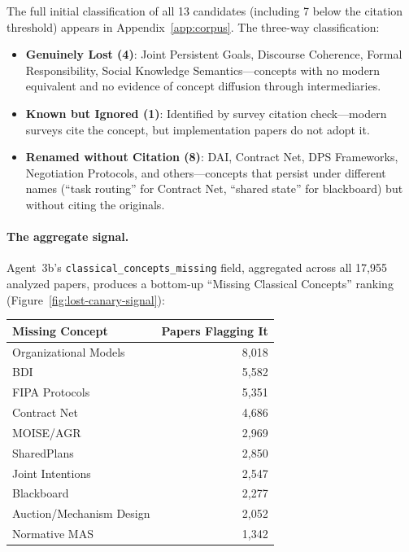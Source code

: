\documentclass{article}
\begin{document}
\noindent
The full initial classification of all 13 candidates (including 7 below the citation
threshold) appears in Appendix~\ref{app:corpus}. The three-way classification:

\begin{itemize}[nosep]
  \item \textbf{Genuinely Lost (4)}: Joint Persistent Goals, Discourse Coherence,
    Formal Responsibility, Social Knowledge Semantics---concepts with no modern
    equivalent and no evidence of concept diffusion through intermediaries.
  \item \textbf{Known but Ignored (1)}: Identified by survey citation check---modern
    surveys cite the concept, but implementation papers do not adopt it.
  \item \textbf{Renamed without Citation (8)}: DAI, Contract Net, DPS Frameworks,
    Negotiation Protocols, and others---concepts that persist under different names
    (``task routing'' for Contract Net, ``shared state'' for blackboard) but without
    citing the originals.
\end{itemize}

\paragraph{The aggregate signal.}
Agent~3b's \texttt{classical\_concepts\_missing} field, aggregated across all 17,955
analyzed papers, produces a bottom-up ``Missing Classical Concepts'' ranking
(Figure~\ref{fig:lost-canary-signal}):

\begin{center}
\begin{tabular}{@{} l r @{}}
\toprule
\textbf{Missing Concept} & \textbf{Papers Flagging It} \\
\midrule
Organizational Models & 8,018 \\
BDI & 5,582 \\
FIPA Protocols & 5,351 \\
Contract Net & 4,686 \\
MOISE/AGR & 2,969 \\
SharedPlans & 2,850 \\
Joint Intentions & 2,547 \\
Blackboard & 2,277 \\
Auction/Mechanism Design & 2,052 \\
Normative MAS & 1,342 \\
\bottomrule
\end{tabular}
\end{center}
\end{document}
